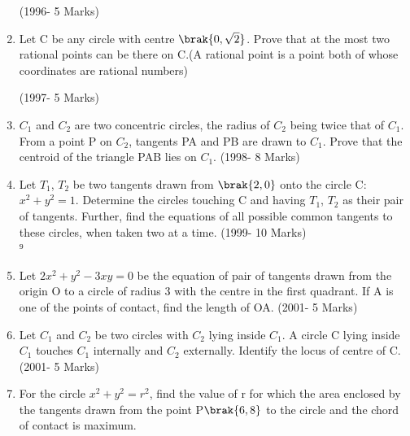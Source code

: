 \documentclass[journal,12pt,twocolumn]{IEEEtran}
\theoremstyle{remark}
\begin{document}
\begin{enumerate}
\hfill(1996- 5 Marks)\\





\item Let C be any circle with centre $\brak{0,\sqrt{2}}$. Prove that at the most two rational points can be there on C.(A rational point is a point both of whose coordinates are rational numbers)
	           
\hfill(1997- 5 Marks)\\




\item $C_{1}$ and $C_{2}$ are two concentric circles, the radius of $C_{2}$ being twice that of $C_{1}$. From a point P on $C_{2}$, tangents PA and PB are drawn to $C_{1}$. Prove that the centroid of the triangle PAB lies on $C_{1}$.
	           \hfill(1998- 8 Marks)\\




\item Let $T_{1}$, $T_{2}$ be two tangents drawn from $\brak{2,0}$ onto the circle C:$x^2+y^2=1$. Determine the circles touching C and having $T_{1}$, $T_{2}$ as their pair of tangents. Further, find the equations of all possible common tangents to these circles, when taken two at a time.
                  \hfill(1999- 10 Marks)\\
⁹



\item Let $2x^2+y^2-3xy=0$ be the equation of pair of tangents drawn from the origin O to a circle of radius 3 with the centre in the first quadrant. If A is one of the points of contact, find the length of OA.                   \hfill(2001- 5 Marks)\\




\item Let $C_{1}$ and $C_{2}$ be two circles with $C_{2}$ lying inside $C_{1}$. A circle C lying inside $C_{1}$ touches $C_{1}$ internally and $C_{2}$ externally. Identify the locus of centre of C.                                \hfill(2001- 5 Marks)\\



\item For the circle $x^2+y^2=r^2$, find the value of r for which the area enclosed by the tangents drawn from the point P$\brak{6,8}$ to the circle and the chord of contact is maximum.



\end{enumerate}
\end{document}
